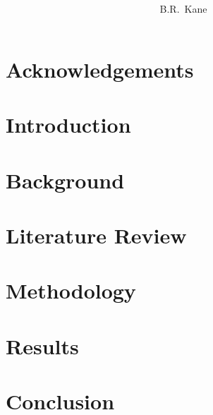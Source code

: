 \documentclass[12pt,a4paper,openany,
               afrikaans,UKenglish,
               masters-t,goldenblock
              ]{stb-thesis}
\title{\bfseries
       \AorE{%
		     \emph{Ergo}: 'n Gebaar-gebaseerde Rekenaarinteraksie-toestel\\[1ex]
             \normalfont\small\itshape
			 (``\emph{Ergo:} A Gesture-Based Computer Interaction Device'')
            }{%
			\emph{Ergo}: A Gesture-Based Computer Interaction Device}}
\author{B.R.\ Kane}{Boyd Robert Kane}
\begin{document}
\frontmatter%
\TitlePage

\DeclarationPage



\chapter*{Acknowledgements}


\tableofcontents

\listoffigures
\listoftables


\mainmatter%

\chapter{Introduction}\label{chap:introduction}


\chapter{Background}\label{chap:background}


\chapter{Literature Review}\label{chap:literature-review}


\chapter{Methodology}\label{chap:methodology}


\chapter{Results}\label{chap:results}


\chapter{Conclusion}\label{chap:conclusion}


\appendix%


\backmatter%


\end{document}
